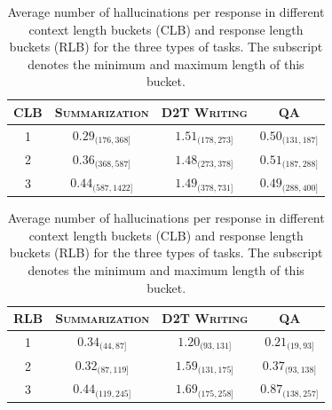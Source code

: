 \begin{table}[!t]
\scriptsize
\centering
    \begin{tabular}{c|ccc}
    \toprule
    CLB & \textsc{Summarization} & \textsc{D2T Writing} & \textsc{QA}\\
    \midrule
     1 &  $0.29_{(176,368]}$ & $1.51_{(178,273]}$ & $0.50_{(131,187]}$ \\
     2 &  $0.36_{(368,587]}$ & $1.48_{(273,378]}$ & $0.51_{(187,288]}$ \\
     3 &  $0.44_{(587,1422]}$ & $1.49_{(378,731]}$ & $0.49_{(288,400]}$ \\
    \bottomrule
    \end{tabular}
    \begin{tabular}{c|ccc}
    \toprule
    RLB & \textsc{Summarization} & \textsc{D2T Writing} & \textsc{QA}\\
    \midrule
     1 &  $0.34_{(44,87]}$ & $1.20_{(93,131]}$ & $0.21_{(19,93]}$ \\
     2 &  $0.32_{(87,119]}$ & $1.59_{(131,175]}$ & $0.37_{(93,138]}$ \\
     3 &  $0.44_{(119,245]}$ & $1.69_{(175,258]}$ & $0.87_{(138,257]}$ \\
    \bottomrule
    \end{tabular}
    \caption{Average number of hallucinations per response in different context length buckets (CLB) and response length buckets (RLB) for the three types of tasks. The subscript denotes the minimum and maximum length of this bucket.}
    \label{tab:cl-vs-halu}
\end{table}